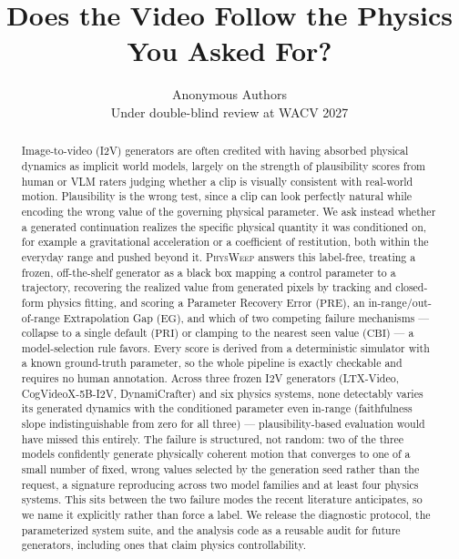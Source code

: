 \newcommand{\torun}[1]{\textcolor{red!70!black}{\textbf{>>> TO RUN:} #1}}
\newcommand{\resph}[1]{\textcolor{blue!60!black}{[RESULT PLACEHOLDER: #1]}}
\newcommand{\PRE}{\ensuremath{\mathrm{PRE}}}
\newcommand{\PRI}{\ensuremath{\mathrm{PRI}}}
\newcommand{\CBI}{\ensuremath{\mathrm{CBI}}}
\newcommand{\EG}{\ensuremath{\mathrm{EG}}}
\newcommand{\thetah}{\ensuremath{\hat{\theta}}}

\title{\textbf{Does the Video Follow the Physics You Asked For?}}

\author{Anonymous Authors\\ Under double-blind review at WACV 2027}
\date{}


\maketitle

\begin{abstract}
Image-to-video (I2V) generators are often credited with having absorbed
physical dynamics as implicit world models, largely on the strength of
plausibility scores from human or VLM raters judging whether a clip is
visually consistent with real-world motion. Plausibility is the wrong
test, since a clip can look perfectly natural while encoding the wrong
value of the governing physical parameter. We ask instead whether a
generated continuation realizes the specific physical quantity it was
conditioned on, for example a gravitational acceleration or a coefficient
of restitution, both within the everyday range and pushed beyond it.
\textsc{PhysWeep} answers this label-free, treating a frozen, off-the-shelf
generator as a black box mapping a control parameter to a trajectory,
recovering the realized value from generated pixels by tracking and
closed-form physics fitting, and scoring a Parameter Recovery Error
(\PRE), an in-range/out-of-range Extrapolation Gap (\EG), and which of two
competing failure mechanisms --- collapse to a single default (\PRI) or
clamping to the nearest seen value (\CBI) --- a model-selection rule
favors. Every score is derived from a deterministic simulator with a known
ground-truth parameter, so the whole pipeline is exactly checkable and
requires no human annotation. Across three frozen I2V generators
(LTX-Video, CogVideoX-5B-I2V, DynamiCrafter) and six physics systems, none
detectably varies its generated dynamics with the conditioned parameter
even in-range (faithfulness slope indistinguishable from zero for all
three) --- plausibility-based evaluation would have missed this entirely.
The failure is structured, not random: two of the three models confidently
generate physically coherent motion that converges to one of a small
number of fixed, wrong values selected by the generation seed rather than
the request, a signature reproducing across two model families and at
least four physics systems. This sits between the two failure modes the
recent literature anticipates, so we name it explicitly rather than force
a label. We release the diagnostic protocol, the parameterized system
suite, and the analysis code as a reusable audit for future generators,
including ones that claim physics controllability.
\end{abstract}

